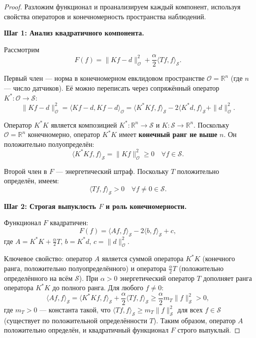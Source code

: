 \documentclass[a4paper,14pt,oneside,openany]{extarticle}
\begin{document}
\begin{proof}
Разложим функционал и проанализируем каждый компонент, используя свойства операторов и 
конечномерность пространства наблюдений.

\textbf{Шаг 1: Анализ квадратичного компонента.}

Рассмотрим
\begin{equation}
    F(f)=\|K f - d\|_{\mathcal{O}}^2 + \frac{\alpha}{2}\langle T f, f\rangle_{\mathcal{S}}.
\end{equation}

Первый член — норма в конечномерном евклидовом пространстве $\mathcal{O} = \mathbb{R}^n$ (где $n$ — число датчиков). 
Её можно переписать через сопряжённый оператор $K^*:\mathcal{O}\to\mathcal{S}$:
\begin{equation}
    \|Kf-d\|_{\mathcal{O}}^2 = \langle Kf-d, Kf-d\rangle_{\mathcal{O}} = \langle K^*Kf, f\rangle_{\mathcal{S}} - 2\langle K^*d, f\rangle_{\mathcal{S}} + \|d\|_{\mathcal{O}}^2.
\end{equation}

Оператор $K^*K$ является композицией $K^*:\mathbb{R}^n\to\mathcal{S}$ и $K:\mathcal{S}\to\mathbb{R}^n$. Поскольку $\mathcal{O}=\mathbb{R}^n$
конечномерно, оператор $K^*K$ имеет \textbf{конечный ранг не выше} $n$. Он положительно полуопределён:
\begin{equation}
    \langle K^*K f, f\rangle_{\mathcal{S}} = \|Kf\|_{\mathcal{O}}^2 \geq 0 \quad \forall f \in \mathcal{S}.
\end{equation}

Второй член в $F$ — энергетический штраф. Поскольку $T$ положительно определён, имеем:
\begin{equation}
    \langle T f, f\rangle_{\mathcal{S}} > 0 \quad \forall f \neq 0 \in \mathcal{S}.
\end{equation}

\textbf{Шаг 2: Строгая выпуклость $F$ и роль конечномерности.}

Функционал $F$ квадратичен:
\begin{equation}
    F(f) = \langle A f, f\rangle_{\mathcal{S}} - 2\langle b, f\rangle_{\mathcal{S}} + c,
\end{equation}
где $A = K^*K + \frac{\alpha}{2}T$, $b = K^*d$, $c = \|d\|_{\mathcal{O}}^2$.

Ключевое свойство: оператор $A$ является суммой оператора $K^*K$ (конечного ранга, положительно полуопределённого) и оператора $\frac{\alpha}{2}T$ 
(положительно определённого на всём $\mathcal{S}$). При $\alpha > 0$ энергетический оператор $T$ дополняет ранга оператора $K^*K$ до полного ранга.
 Для любого $f \neq 0$:
\begin{equation}
    \langle A f, f\rangle_{\mathcal{S}} = \langle K^*K f, f\rangle_{\mathcal{S}} + \frac{\alpha}{2}\langle T f, f\rangle_{\mathcal{S}} \geq \frac{\alpha}{2} m_T \|f\|_{\mathcal{S}}^2 > 0,
\end{equation}
где $m_T > 0$ — константа такой, что $\langle T f, f\rangle_{\mathcal{S}} \geq m_T \|f\|_{\mathcal{S}}^2$ для всех $f \in \mathcal{S}$ (существует по положительной определённости $T$). Таким образом, оператор $A$ положительно определён, и квадратичный функционал $F$ строго выпуклый.


\end{proof}
\end{document}
